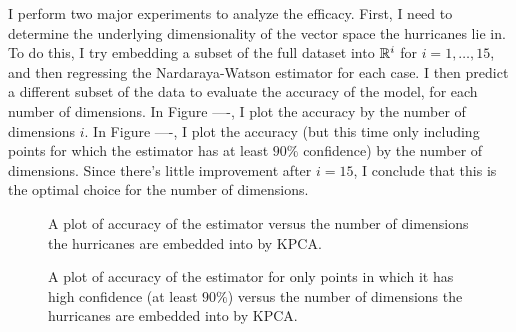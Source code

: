 
\par
I perform two major experiments to analyze the efficacy.
First, I need to determine the underlying dimensionality of the vector space the hurricanes lie in.
To do this, I try embedding a subset of the full dataset into $\mathbb{R}^{i}$ for $i=1,\ldots,15$, and then regressing the Nardaraya-Watson estimator for each case.
I then predict a different subset of the data to evaluate the accuracy of the model, for each number of dimensions.
In Figure ----, I plot the accuracy by the number of dimensions $i$.
In Figure ----, I plot the accuracy (but this time only including points for which the estimator has at least $90\%$ confidence) by the number of dimensions.
Since there's little improvement after $i=15$, I conclude that this is the optimal choice for the number of dimensions.

\begin{figure}
	\centering
	\caption{A plot of accuracy of the estimator versus the number of dimensions the hurricanes are embedded into by KPCA.}
	\label{fig:dimensions}
\end{figure}

\begin{figure}
	\centering
	\caption{A plot of accuracy of the estimator for only points in which it has high confidence (at least $90\%$) versus the number of dimensions the hurricanes are embedded into by KPCA.}
	\label{fig:confident_dimensions}
\end{figure}